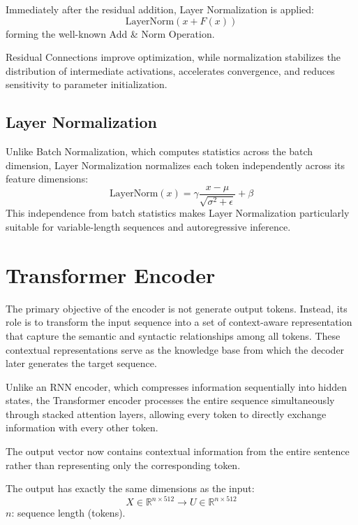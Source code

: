 Immediately after the residual addition, Layer Normalization is applied:
\begin{equation}
\text{LayerNorm}(x + F(x))
\end{equation}
forming the well-known Add \& Norm Operation.

Residual Connections improve optimization, while normalization stabilizes the distribution of intermediate activations, accelerates convergence, and reduces sensitivity to parameter initialization.

\subsection{Layer Normalization}
Unlike Batch Normalization, which computes statistics across the batch dimension, Layer Normalization normalizes each token independently across its feature dimensions:
\begin{equation}
\text{LayerNorm}(x) = \gamma \frac{x - \mu}{\sqrt{\sigma^2 + \epsilon}} + \beta
\end{equation}
This independence from batch statistics makes Layer Normalization particularly suitable for variable-length sequences and autoregressive inference.

\section{Transformer Encoder}
The primary objective of the encoder is not generate output tokens. Instead, its role is to transform the input sequence into a set of context-aware representation that capture the semantic and syntactic relationships among all tokens. These contextual representations serve as the knowledge base from which the decoder later generates the target sequence.

Unlike an RNN encoder, which compresses information sequentially into hidden states, the Transformer encoder processes the entire sequence simultaneously through stacked attention layers, allowing every token to directly exchange information with every other token.

The output vector now contains contextual information from the entire sentence rather than representing only the corresponding token.

The output has exactly the same dimensions as the input:
\begin{equation}
X \in \mathbb{R}^{n \times 512} \longrightarrow U \in \mathbb{R}^{n \times 512}
\end{equation}
$n$: sequence length (tokens).

